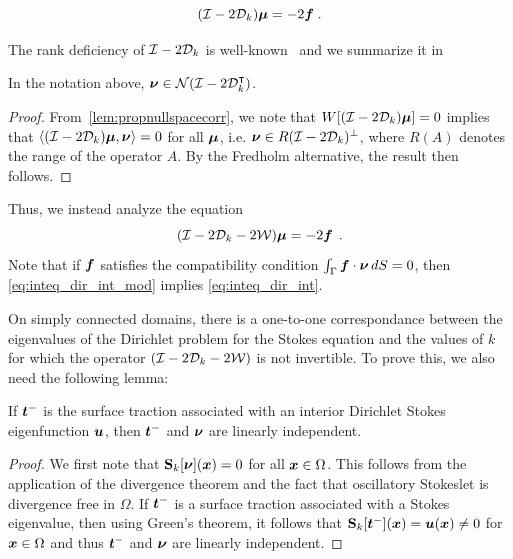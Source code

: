 \begin{equation}
  (\mathcal I - 2{\mathcal D}_{k}) {\boldsymbol \mu} = -2{\boldsymbol f} \; . \label{eq:inteq_dir_int}
\end{equation}

The rank deficiency of $\mathcal I-2{\mathcal D}_{k}$ is
well-known~\cite{biros2002embedded} and we summarize it
in

\begin{lem}
  \label{lem:nunull} In the notation above,
  ${\boldsymbol \nu} \in {\mathcal N}(\mathcal I - 2{\mathcal D}_{k}^{\intercal})$.
\end{lem}
\begin{proof}
From~\cref{lem:propnullspacecorr}, we note that
$W[(\mathcal I - 2{\mathcal D}_{k}){\boldsymbol \mu}] =0$ implies that
$\left<(\mathcal I -2{\mathcal D}_{k}){\boldsymbol \mu} ,{\boldsymbol \nu} \right> = 0$ for
all ${\boldsymbol \mu}$, i.e. ${\boldsymbol \nu} \in R(\mathcal I - 2{\mathcal D}_{k})^{\perp}$, where
$R(A)$ denotes the range of the operator $A$. 
By the Fredholm alternative, the result then follows.
\end{proof}
Thus, we instead analyze the equation
\begin{equation}
(\mathcal I - 2{\mathcal D}_{k}  -2{\mathcal W}) {\boldsymbol \mu} = -2{\boldsymbol f} \; \, . \label{eq:inteq_dir_int_mod}
\end{equation}
Note that if ${\boldsymbol f}$ satisfies the compatibility
condition $\int_\Gamma {\boldsymbol f} \cdot {\boldsymbol \nu} \, dS =0$, then
\cref{eq:inteq_dir_int_mod} implies \cref{eq:inteq_dir_int}.

On simply connected domains, there is a one-to-one correspondance between
the eigenvalues of the Dirichlet problem for
the Stokes equation
and the values of $k$ for which the operator $(\mathcal I - 2{\mathcal D}_{k} - 2{\mathcal W})$
is not invertible. To prove this, we also need the 
following lemma:
\begin{lem}
  \label{lem:nutracli}
  If ${\boldsymbol t}^{-}$ is the surface traction associated
  with an interior Dirichlet Stokes eigenfunction ${\boldsymbol u}$,
  then ${\boldsymbol t}^{-}$ and ${\boldsymbol \nu}$ are linearly independent.
\end{lem}
\begin{proof}
We first note that ${\bf S}_{k}[{\boldsymbol \nu}]({\boldsymbol x}) = 0$ for all ${\boldsymbol x} \in \Omega$.
This follows from the application of the divergence theorem and the fact that
oscillatory Stokeslet is divergence free in $\Omega$. 
If ${\boldsymbol t}^{-}$ is a surface traction associated with a Stokes eigenvalue, then
using Green's theorem, it follows that
${\bf S}_{k}[{\boldsymbol t}^{-}]({\boldsymbol x}) = {\boldsymbol u}({\boldsymbol x}) \neq 0$ for ${\boldsymbol x} \in \Omega$ and
thus ${\boldsymbol t}^{-}$ and ${\boldsymbol \nu}$ are linearly independent.
\end{proof}

